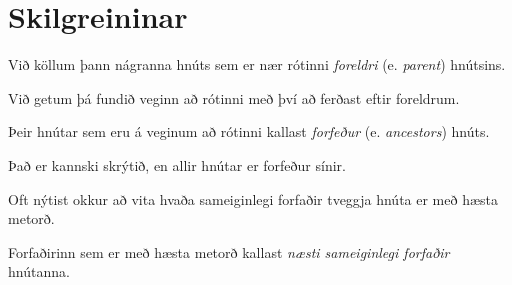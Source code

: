 \section{Skilgreininar}
{
    {
        \item<1-> Við köllum þann nágranna hnúts sem er nær rótinni \emph{foreldri} (e. \emph{parent}) hnútsins.
        \item<2-> Við getum þá fundið veginn að rótinni með því að ferðast eftir foreldrum.
        \item<3-> Þeir hnútar sem eru á veginum að rótinni kallast \emph{forfeður} (e. \emph{ancestors}) hnúts.
        \item<4-> Það er kannski skrýtið, en allir hnútar er forfeður sínir.
        \item<5-> Oft nýtist okkur að vita hvaða sameiginlegi forfaðir tveggja hnúta er með hæsta metorð.
        \item<6-> Forfaðirinn sem er með hæsta metorð kallast \emph{næsti sameiginlegi forfaðir} hnútanna.
    }
}

